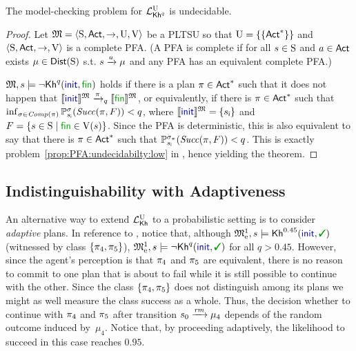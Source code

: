 \begin{theorem}\label{th:mc:PKhunc:undecidable}
  The model-checking problem for $\PKhunc$ is undecidable.
\end{theorem}
%
\begin{proof}
  Let $\model=\tup{\S,\Act,\ra,\Unc,\V}$ be a PLTSU so that
  $\Unc=\{\{\Act^*\}\}$ and $\tup{\S,\Act,\ra,\V}$ is a complete PFA.
  (A PFA is complete if for all $s\in\S$ and $a\in\Act$ exists
  $\mu\in\Dist(\S)$ s.t. $s\reach{a}\mu$ and any PFA
  has an equivalent complete PFA.)

  $\model,s\models\neg\kh^q(\init,\fin)$ holds if there is a plan
  ${\plan\in \Act^*}$ such that it does not happen that
  ${\truthset{\model}{\init}\reach{\plan}_q\truthset{\model}{\fin}}$,
  or equivalently, if there is $\plan\in \Act^*$  such that
  $\inf_{\strat\in\Comp(\plan)}\Prob^\strat_{\sini}(\Succ(\plan,F)) < q$,
  where $\truthset{\model}{\init}=\{\sini\}$ and
  $F=\{{s\in\S}\mid{\fin\in\V(s)}\}$.
  Since the PFA is deterministic, this is also equivalent to say that
  there is $\plan\in \Act^*$ such that
  $\Prob^{\strat_\plan}_{\sini}(\Succ(\plan,F)) < q$.
  This is exactly problem~\ref{prop:PFA:undecidabilty:low} in
  , hence yielding the theorem.
\end{proof}
  


\subsection{Indistinguishability with Adaptiveness}\label{subsec:prob:indist:adaptive}

An alternative way to extend $\Khunc$ to a probabilistic setting is to
consider \emph{adaptive} plans.
%
In reference to , notice that, although
$\modelex^1,s \models \kh^{0.45}(\init,\goal)$ (witnessed by class
$\{\plan_4,\plan_5\}$), $\modelex^1,s \models \neg\kh^q(\init,\goal)$
for all $q>0.45$.
%
However, since the agent's perception is that $\plan_4$ and $\plan_5$
are equivalent, there is no reason to commit to one plan that is about
to fail while it is still possible to continue with the other.  Since
the class $\{\plan_4,\plan_5\}$ does not distinguish among its plans
we might as well measure the class success as a whole.
%
Thus, the decision whether to continue with $\plan_4$ and $\plan_5$
after transition $s_0\reach{\ramp}\mu_4$ depends of the random outcome
induced by~$\mu_4$.  Notice that, by proceeding adaptively, the
likelihood to succeed in this case reaches $0.95$.

